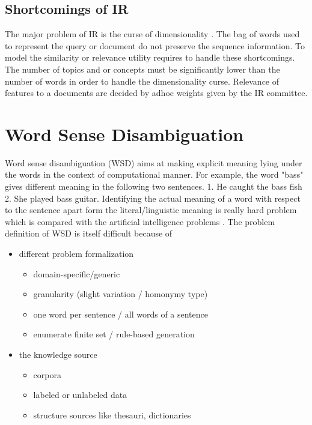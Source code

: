 \documentclass{bmcart}
\begin{document}
\subsection{Shortcomings of IR}
\label{ssec:disadvIR}
The major problem of IR is the curse of dimensionality \cite{statisticallearning}. The bag of words used to represent the query or document do not preserve the sequence information. To model the similarity or relevance utility requires to handle these shortcomings. The number of topics and or concepts must be significantly lower than the number of words in order to handle the dimensionality curse. Relevance of features to a documents are decided by adhoc weights given by the IR committee.

\section{Word Sense Disambiguation}
\label{sec:wsd}

Word sense disambiguation (WSD) aims at making explicit meaning lying under the words in the context of computational manner. For example, the word "bass" gives different meaning in the following two sentences. 1. He caught the bass fish 2. She played bass guitar. Identifying the actual meaning of a word with respect to the sentence apart form the literal/linguistic meaning is really hard problem which is compared with the artificial intelligence problems \cite{navigili}. The problem definition of WSD is itself difficult because of 
\begin{itemize}
\item different problem formalization
	\begin{itemize}
	\item domain-specific/generic
	\item granularity (slight variation / homonymy type)
	\item one word per sentence / all words of a sentence
	\item enumerate finite set / rule-based generation
	\end{itemize}
\item the knowledge source
	\begin{itemize}
	\item corpora
	\item labeled or unlabeled data
	\item structure sources like thesauri, dictionaries
	\end{itemize}
\end{itemize}
\end{document}
